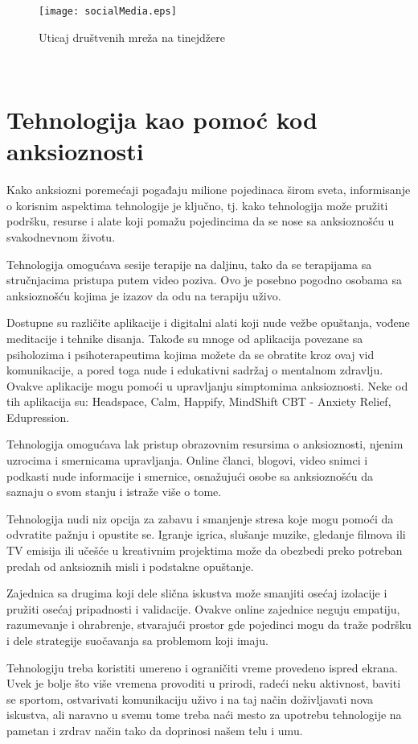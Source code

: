 \documentclass[a4paper]{article}
\begin{document}
            \begin{figure}[h]
            \caption{ Uticaj društvenih mreža na tinejdžere \cite{peta}}
            \centering
            \texttt{[image: socialMedia.eps]}
            \end{figure}
            \\
		
		\section{Tehnologija kao pomoć kod anksioznosti}	
		\label{sec:termini_i_citiranje}
            Kako anksiozni poremećaji pogađaju milione pojedinaca širom sveta, informisanje o korisnim aspektima tehnologije je ključno, tj. kako tehnologija može pružiti podršku, resurse i alate koji pomažu pojedincima da se nose sa anksioznošću u svakodnevnom životu. 


            
              \par Tehnologija omogućava sesije terapije na daljinu, tako da se terapijama sa stručnjacima pristupa putem video poziva. Ovo je posebno pogodno osobama sa anksioznošću kojima je izazov da odu na terapiju uživo. 
              \par  Dostupne su različite aplikacije i digitalni alati koji nude vežbe opuštanja, vođene meditacije i tehnike disanja. Takođe su mnoge od aplikacija povezane sa psiholozima i psihoterapeutima kojima možete da se obratite kroz ovaj vid komunikacije, a pored toga nude i edukativni sadržaj o mentalnom zdravlju. Ovakve aplikacije mogu pomoći u upravljanju simptomima anksioznosti. Neke od tih aplikacija su: Headspace, Calm, Happify, MindShift CBT - Anxiety Relief, Edupression.
              \par  Tehnologija omogućava lak pristup obrazovnim resursima o anksioznosti, njenim uzrocima i smernicama upravljanja. Online članci, blogovi, video snimci i podkasti nude informacije i smernice, osnažujući osobe sa anksioznošću da saznaju o svom stanju i istraže više o tome.
              \par Tehnologija nudi niz opcija za zabavu i smanjenje stresa koje mogu pomoći da odvratite pažnju i opustite se. Igranje igrica, slušanje muzike, gledanje filmova ili TV emisija ili učešće u kreativnim projektima može da obezbedi preko potreban predah od anksioznih misli i podstakne opuštanje.

               \par Zajednica sa drugima koji dele slična iskustva može smanjiti osećaj izolacije i pružiti osećaj pripadnosti i validacije. Ovakve online zajednice neguju empatiju, razumevanje i ohrabrenje, stvarajući prostor gde pojedinci mogu da traže podršku i dele strategije suočavanja sa problemom koji imaju.
               \par Tehnologiju treba koristiti umereno i ograničiti vreme provedeno ispred ekrana. Uvek je bolje što više vremena provoditi u prirodi, radeći neku aktivnost, baviti se sportom, ostvarivati komunikaciju uživo i na taj način doživljavati nova iskustva, ali naravno u svemu tome treba naći mesto za upotrebu tehnologije na pametan i zrdrav način tako da doprinosi našem telu i umu.
         
\end{document}
